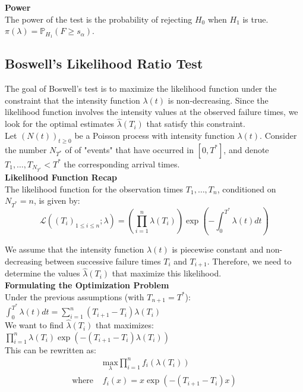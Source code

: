 \documentclass{journalstyle}
\begin{document}
\noindent\textbf{Power} \\
The power of the test is the probability of rejecting $H_0$ when $H_1$ is true. \\
$\pi(\lambda) = \mathbb{P}_{H_1}(F \geq s_{\alpha})$.


\subsection{Boswell's Likelihood Ratio Test}

The goal of Boswell's test is to maximize the likelihood function under the constraint that the intensity function $\lambda(t)$ is non-decreasing.
Since the likelihood function involves the intensity values at the observed failure times, we look for the optimal estimates $\hat{\lambda}(T_i)$ that satisfy this constraint. \\

Let $(N(t))_{t \geq 0}$ be a Poisson process with intensity function $\lambda(t)$.
Consider the number $N_{T^*}$ of of "events" that have occurred in $[0, T^*]$, and denote $T_1, \ldots, T_{N_{T^*}} < T^*$ the corresponding arrival times. \\


\noindent\textbf{Likelihood Function Recap} \\
The likelihood function for the observation times $T_1, \ldots, T_n$, conditioned on $N_{T^*} = n$, is given by:
$$
\mathcal{L}((T_i)_{1 \leq i \leq n}; \lambda) = \left(\prod_{i=1}^n \lambda(T_i)\right) \exp\left(-\int_0^{T^*} \lambda(t) dt\right)
$$

We assume that the intensity function $\lambda(t)$ is piecewise constant and non-decreasing between successive failure times $T_{i}$ and $T_{i+1}$.
Therefore, we need to determine the values $\hat{\lambda}(T_i)$ that maximize this likelihood. \\

\noindent\textbf{Formulating the Optimization Problem} \\
Under the previous assumptions (with $T_{n+1} = T^*$): \\
$\int_0^{T^*} \lambda(t) dt = \sum_{i=1}^n (T_{i+1} - T_i) \lambda(T_i)$ \\

\noindent We want to find $\hat{\lambda}(T_i)$ that maximizes: \\
$\prod_{i=1}^{n} \lambda(T_i) \exp(-(T_{i+1} - T_i) \lambda(T_i))$ \\

This can be rewritten as: \\
\begin{equation*}
    \begin{split}
        &\underset{\lambda}{\text{max}} \prod_{i=1}^{n} f_i(\lambda(T_i)) \\
        \text{where } &f_i(x) = x \exp(-(T_{i+1} - T_i) x)
    \end{split}
    \label{eq:boswell_optimization_problem}
\end{equation*}
\end{document}
